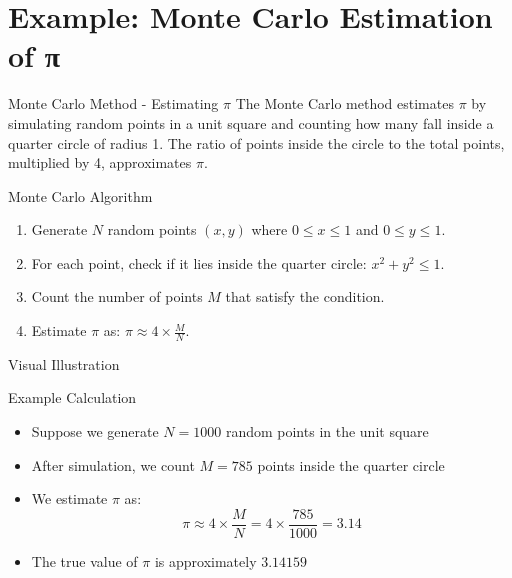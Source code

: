 
\section[Example: Monte Carlo Estimation of pi]{Example: Monte Carlo Estimation of π}
\begin{frame}{Monte Carlo Method - Estimating $\pi$}
  The Monte Carlo method estimates $\pi$ by simulating random points in a unit square and counting how many fall inside a quarter circle of radius 1. The ratio of points inside the circle to the total points, multiplied by 4, approximates $\pi$.
\end{frame}



\begin{frame}{Monte Carlo Algorithm}
  \begin{enumerate}
    \item Generate $N$ random points $(x, y)$ where $0 \leq x \leq 1$ and $0 \leq y \leq 1$.
    \item For each point, check if it lies inside the quarter circle: $x^2 + y^2 \leq 1$.
    \item Count the number of points $M$ that satisfy the condition.
    \item Estimate $\pi$ as: $\pi \approx 4 \times \frac{M}{N}$.
  \end{enumerate}
\end{frame}

\begin{frame}{Visual Illustration}
  \begin{center}
  \end{center}
\end{frame}


\begin{frame}{Example Calculation}
  \begin{itemize}
    \item Suppose we generate $N = 1000$ random points in the unit square
    \item After simulation, we count $M = 785$ points inside the quarter circle
    \item We estimate $\pi$ as:
          \[ \pi \approx 4 \times \frac{M}{N} = 4 \times \frac{785}{1000} = 3.14 \]
    \item The true value of $\pi$ is approximately $3.14159$
  \end{itemize}
\end{frame}

